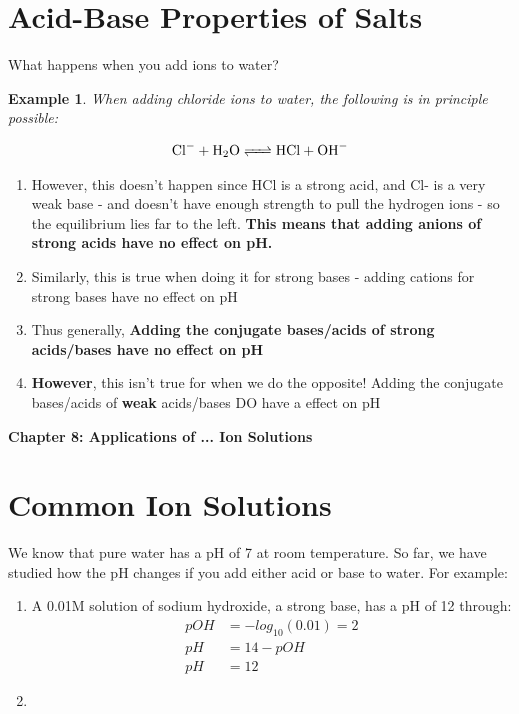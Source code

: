 \documentclass{article}  %
\newtheorem{exmp}{Example}
\begin{document}
\section*{Acid-Base Properties of Salts}
What happens when you add ions to water? 
\newline
\begin{exmp}
    When adding chloride ions to water, the following is in principle possible:
\end{exmp}
\begin{equation*}
    \begin{aligned}
        \ce{Cl- + H2O <=> HCl + OH-}
    \end{aligned}
\end{equation*}
\begin{enumerate}
    \item However, this doesn't happen since HCl is a strong acid, and Cl- is a very weak base - and doesn't have enough strength to pull the hydrogen ions - so the equilibrium lies far to the left. \textbf{This means that adding anions of strong acids have no effect on pH.} 
    \item Similarly, this is true when doing it for strong bases - adding cations for strong bases have no effect on pH
    \item Thus generally, \textbf{Adding the conjugate bases/acids of strong acids/bases have no effect on pH}
    \item \textbf{However}, this isn't true for when we do the opposite! Adding the conjugate bases/acids of \textbf{weak} acids/bases DO have a effect on pH 
\end{enumerate} 

\begin{center}
    \LARGE{\textbf{Chapter 8: Applications of ... Ion Solutions}}
\end{center}
\section*{Common Ion Solutions}
We know that pure water has a pH of 7 at room temperature. 
So far, we have studied how the pH changes if you add either acid or base to water. For example:
\begin{enumerate}
    \item A 0.01M solution of sodium hydroxide, a strong base, has a pH of 12 through:
    \begin{equation*}
        \begin{aligned}
            pOH &= -log_{10}(0.01) = 2 \\
            pH &= 14-pOH \\
            pH &= 12
        \end{aligned}
    \end{equation*}
    \item 
\end{enumerate}
\end{document}
